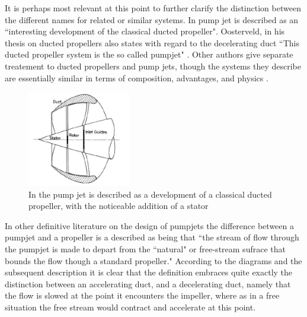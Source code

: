 \documentclass{article}\usepackage[]{graphicx}\usepackage[]{color}
\begin{document}
It is perhaps most relevant at this point to further clarify the distinction between the different names for related or similar systems.  In \cite[17]{carlton2007} pump jet is described as an ``interesting development of the classical ducted propeller". Oosterveld, in his thesis on ducted propellers also states with regard to the decelerating duct ``This ducted propeller system is the so called pumpjet" \parencite[8]{oosterveld1970}.  Other authors give separate treatement to ducted propellers and pump jets, though the systems they describe are essentially similar in terms of composition, advantages, and physics \parencite[288]{lewis1988}.

\begin{figure}[h]
\captionsetup{width=0.4\textwidth}
\includegraphics[width=0.4\textwidth, center]{PumpjetOutline.png}
\caption{In \cite{carlton2007} the pump jet is described as a development of a classical ducted propeller, with the noticeable addition of a stator}
\label{fig:PumpjetOutline.png}
\end{figure}

In other definitive literature on the design of pumpjets \parencite{henderson1964} the difference between a pumpjet and a propeller is a described as being that ``the stream of flow through the pumpjet is made to depart from the ``natural" or free-stream sufrace that bounds the flow though a standard propeller."  According to the diagrams and the subsequent description it is clear that the definition embraces quite exactly the distinction between an accelerating duct, and a decelerating duct, namely that the flow is slowed at the point it encounters the impeller, where as in a free situation the free stream would contract and accelerate at this point.
\end{document}

